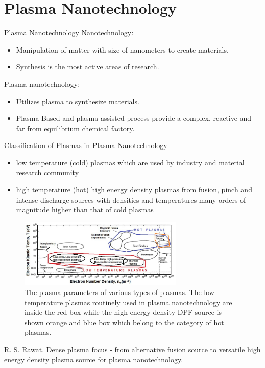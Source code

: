 \section{Plasma Nanotechnology}

\begin{frame} {Plasma Nanotechnology}
    Nanotechnology:
    \begin{itemize}
        \item Manipulation of matter with size of nanometers to create materials.
        \item Synthesis is the most active areas of research.
    \end{itemize}

    Plasma nanotechnology:
    \begin{itemize}
        \item Utilizes plasma to synthesize materials.
        \item Plasma Based and plasma-assisted process provide a complex, reactive and far from equilibrium chemical factory.
    \end{itemize}
\end{frame}

\begin{frame} {Classification of Plasmas in Plasma Nanotechnology}
    \begin{itemize}
        \item low temperature
              (cold) plasmas which are used by industry and material research community
        \item high temperature
              (hot) high energy density plasmas from fusion, pinch and intense discharge sources with densities and
              temperatures many orders of magnitude higher than that of cold plasmas
    \end{itemize}
    \begin{figure}
        \centering
        \includegraphics[width=0.7\textwidth]{figures/plasma-classification.png}
        \caption{\scriptsize The plasma parameters of various types of plasmas. The low temperature plasmas routinely used in plasma nanotechnology are inside the red box while the high energy density DPF source is shown orange and blue box which belong to the category of hot plasmas. \cite{rawat_2015_dense}}
        \label{fig:plasma-classification}
    \end{figure}
    \tiny{\cite{rawat_2015_dense} R. S. Rawat. Dense plasma focus - from alternative fusion source to versatile high energy density plasma source for plasma nanotechnology.}
\end{frame}

